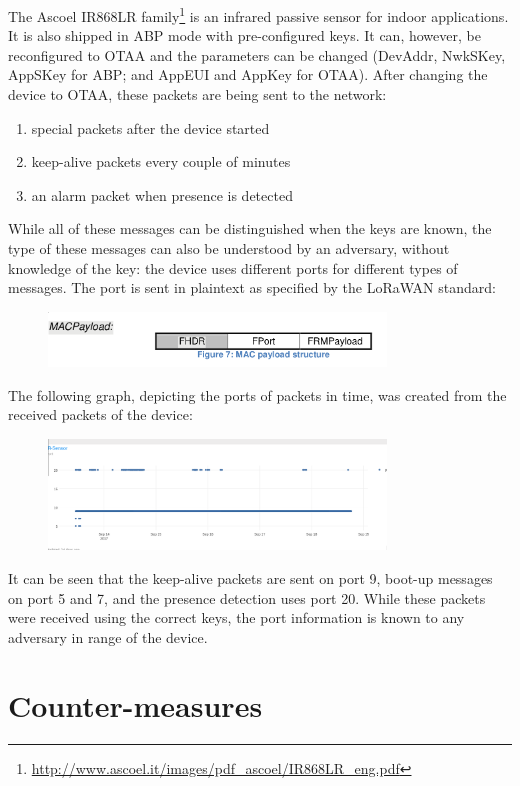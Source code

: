 {{The Ascoel IR868LR family\footnote{\url{http://www.ascoel.it/images/pdf_ascoel/IR868LR_eng.pdf}} is
an infrared passive sensor for indoor applications. It is also shipped
in ABP mode with pre-configured keys. It can, however, be reconfigured
to OTAA and the parameters can be changed (DevAddr, NwkSKey, AppSKey for
ABP; and AppEUI and AppKey for OTAA). After changing the device to OTAA,
these packets are being sent to the network:}
\begin{enumerate}
\tightlist
\item
  {special packets after the device started}
\item
  {keep-alive packets every couple of minutes}
\item
  {an alarm packet when presence is detected}
\end{enumerate}
While all of these messages can be distinguished when the keys are
known, the type of these messages can also be understood by an
adversary, without knowledge of the key: the device uses different
ports for different types of messages. The port is sent in
plaintext as specified by the LoRaWAN standard:}
\begin{figure}[h!]
{\includegraphics[width=0.8\textwidth]{images/image13.png}}
\end{figure}

{The following graph, depicting the ports of packets in time, was
created from the received packets of the device:}
\begin{figure}[h!]
{\includegraphics[width=0.8\textwidth]{images/image3.png}}
\end{figure}

{It can be seen that the keep-alive packets are sent on port 9,
boot-up messages on port 5 and 7, and the presence detection uses port 20.
While these packets were received using the correct keys, the port
information is known to any adversary in range of the device.}

\section{Counter-measures}\label{h.5p1f7221qm42}

